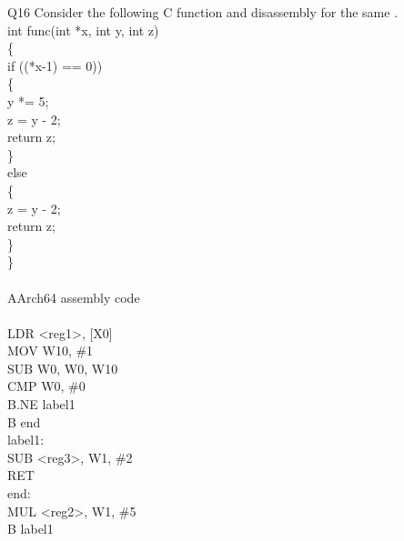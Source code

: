 \documentclass[a4paper]{article}
\begin{document}
{\begin{question}{Q16}   
Consider the following C function and disassembly for the same .\\
int func(int *x,  int y, int z) \\
\{ \\
	if ((*x-1) == 0)) \\
	\{ \\
		\hspace*{5 mm} 	y *= 5; \\
		\hspace*{5 mm} z = y - 2; \\
		\hspace*{5 mm} 	return z; \\
	\} \\
	else \\
	\{ \\
		\hspace*{5 mm} 		z = y - 2; \\
		\hspace*{5 mm} 	return z; \\
	\} \\
\} \\	
\\
AArch64 assembly code \\ 
\\
 	\hspace*{5 mm} LDR <reg1>, [X0] \\
	\hspace*{5 mm} MOV W10, \#1 \\
	\hspace*{5 mm} SUB W0, W0, W10 \\
	\hspace*{5 mm} 	CMP W0, \#0 \\
	\hspace*{5 mm} B.NE label1 \\
	\hspace*{5 mm} B end \\
label1: \\
    \hspace*{5 mm} SUB <reg3>, W1, \#2 \\
 	\hspace*{5 mm}     RET \\
end: \\
	\hspace*{5 mm} MUL <reg2>, W1, \#5 \\
    \hspace*{5 mm} B label1 \\


\end{question}}
\end{document}
